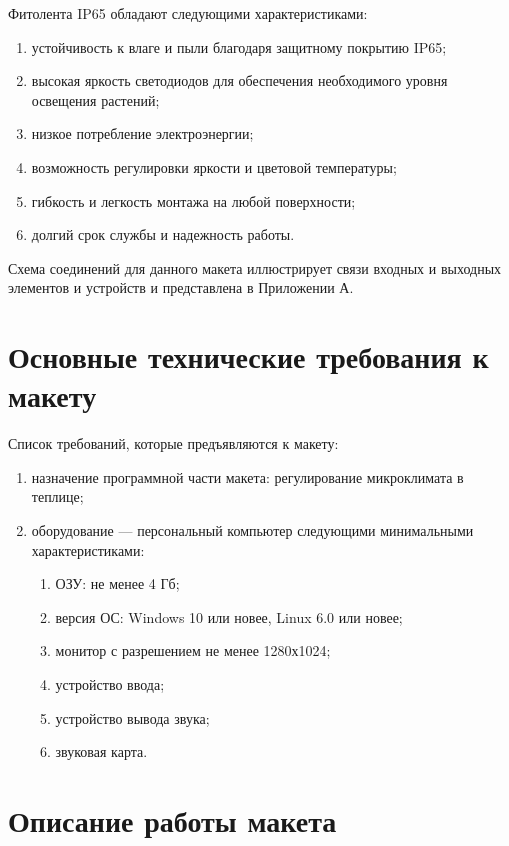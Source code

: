 \begin{enumerate}
    Фитолента IP65 обладают следующими характеристиками:
    
    \begin{enumerate}
        \item устойчивость к влаге и пыли благодаря защитному покрытию IP65;
        \item высокая яркость светодиодов для обеспечения необходимого уровня освещения растений;
        \item низкое потребление электроэнергии;
        \item возможность регулировки яркости и цветовой температуры;
        \item гибкость и легкость монтажа на любой поверхности;
        \item долгий срок службы и надежность работы.
    \end{enumerate}
\end{enumerate}

Схема соединений для данного макета иллюстрирует связи входных и выходных элементов и устройств и представлена в Приложении А.

\section{Основные технические требования к макету}

Список требований, которые предъявляются к макету:
\begin{enumerate}
    \item назначение программной части макета: регулирование микроклимата в теплице;
    \item оборудование --- персональный компьютер следующими минимальными характеристиками:
    \begin{enumerate}
        \item ОЗУ: не менее 4 Гб;
        \item версия ОС: Windows 10 или новее, Linux 6.0 или новее;
        \item монитор с разрешением не менее 1280х1024;
        \item устройство ввода;
        \item устройство вывода звука;
        \item звуковая карта.
    \end{enumerate}
\end{enumerate}

\section{Описание работы макета}

